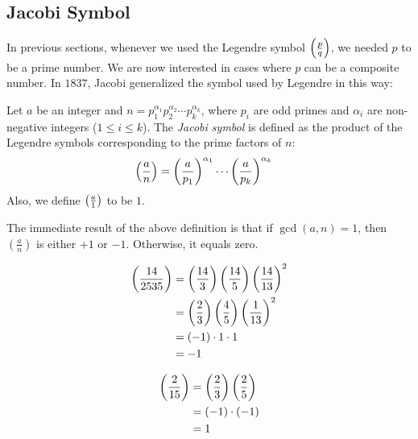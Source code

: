 \subsection{Jacobi Symbol}
In previous sections, whenever we used the Legendre symbol $\left(\frac{p}{q}\right)$, we needed $p$ to be a prime number. We are now interested in cases where $p$ can be a composite number. In $1837$, Jacobi generalized the symbol used by Legendre in this way:

\begin{definition}\label{def:jacobi}
	Let $a$ be an integer and $n=p_1^{\alpha_1}p_2^{\alpha_2}\cdots p_k^{\alpha_k}$, where $p_i$ are odd primes and $\alpha_i$ are non-negative integers ($1 \leq i \leq k$). The \textit{Jacobi symbol} is defined as the product of the Legendre symbols corresponding to the prime factors of $n$:
	\begin{align*}
		\left(\frac{a}{n}\right)
			& = \left(\frac{a}{p_1}\right)^{\alpha_1}\cdots \left(\frac{a}{p_k}\right)^{\alpha_k}
	\end{align*}
	Also, we define $\left(\frac{a}{1}\right)$ to be $1$.
\end{definition}

\begin{remark}
		The immediate result of the above definition is that if $\gcd(a,n) = 1$, then $\left(\frac{a}{n}\right)$ is either $+1$ or $-1$. Otherwise, it equals zero.
\end{remark}

\begin{example}
	\begin{align*}
	\left(\frac{14}{2535}\right) &= \left(\frac{14}{3}\right)\left(\frac{14}{5}\right) \left(\frac{14}{13}\right)^{2}\\
	&= \left(\frac{2}{3}\right)\left(\frac{4}{5}\right) \left(\frac{1}{13}\right)^{2}\\
	&= (-1) \cdot 1 \cdot 1\\
	&= -1
	\end{align*}
\end{example}

\begin{example}
	\begin{align*}
		\left(\frac{2}{15}\right)
			& = \left(\frac{2}{3}\right)\left(\frac{2}{5}\right)\\
			& = (-1)\cdot (-1)\\
			& =1
	\end{align*}

\end{example}

